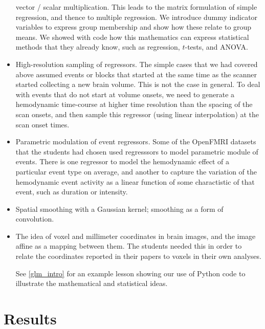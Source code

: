 \begin{itemize}
        vector / scalar multiplication.  This leads to the matrix formulation
        of simple regression, and thence to multiple regression.  We introduce
        dummy indicator variables to express group membership and show how
        these relate to group means.  We showed with code how this mathematics
        can express statistical methods that they already know, such as
        regression, $t$-tests, and ANOVA.
\item
    High-resolution sampling of regressors.  The simple cases that we had
        covered above assumed events or blocks that started at the same time
        as the scanner started collecting a new brain volume.  This is not the
        case in general.  To deal with events that do not start at volume
        onsets, we need to generate a hemodynamic time-course at higher
        time resolution than the spacing of the scan onsets, and then sample
        this regressor (using linear interpolation) at the scan onset times.
\item
    Parametric modulation of event regressors.  Some of the OpenFMRI datasets
        that the students had chosen used regresssors to model parametric
        module of events.  There is one regressor to model the hemodynamic
        effect of a particular event type on average, and another to capture
        the variation of the hemodynamic event activity as a linear function
        of some charactistic of that event, such as duration or intensity.
\item
    Spatial smoothing with a Gaussian kernel; smoothing as a form of
    convolution.

\item
    The idea of voxel and millimeter coordinates in brain images, and the
    image affine as a mapping between them.  The students needed this in order
    to relate the coordinates reported in their papers to voxels in their own
    analyses.

See \cref{glm_intro} for an example lesson showing our use of Python code to
illustrate the mathematical and statistical ideas.




\end{itemize}

\section{Results}\label{results}

